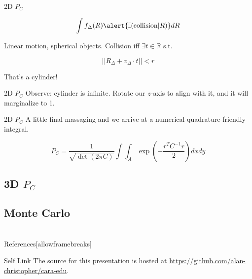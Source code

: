 \documentclass[pdf]{beamer}
\makeatletter
\def\beamer@writeslidentry@miniframesoff{%
  \expandafter\beamer@ifempty\expandafter{\beamer@framestartpage}{}%
  {%
    \clearpage\beamer@notesactions%
  }
}
\newcommand*{\miniframesoff}{\let\beamer@writeslidentry=\beamer@writeslidentry@miniframesoff}
\makeatother
\begin{document}
\begin{frame}{2D $P_C$}

  \[ \int f_\Delta(R) \alert{\mathbb{I}(\text{collision} | R)} dR \]

  Linear motion, spherical objects. Collision iff $\exists t \in \mathbb{R}$ s.t.

  \[ ||R_\Delta + v_\Delta \cdot t|| < r \]

  That's a cylinder!

\end{frame}


\begin{frame}{2D $P_C$}
  Observe: cylinder is infinite. Rotate our $z$-axis to align with it, and it
  will marginalize to 1.



\end{frame}

\begin{frame}{2D $P_C$}
  A little final massaging and we arrive at a numerical-quadrature-friendly
  integral.
  
  \[ P_C = \frac{1}{\sqrt{\det(2\pi C)}} \int\int_A \exp \left( -\frac{r^TC^{-1}r}{2}\right)dxdy \]
\end{frame}



\subsection{3D $P_C$}

\subsection{Monte Carlo}

\miniframesoff
\section*{}
\begin{frame}{References}[allowframebreaks]
  \tiny
\end{frame}

\begin{frame}{Self Link}
  The source for this presentation is hosted at
\url{https://github.com/alan-christopher/cara-edu}.

\end{frame}
\end{document}
